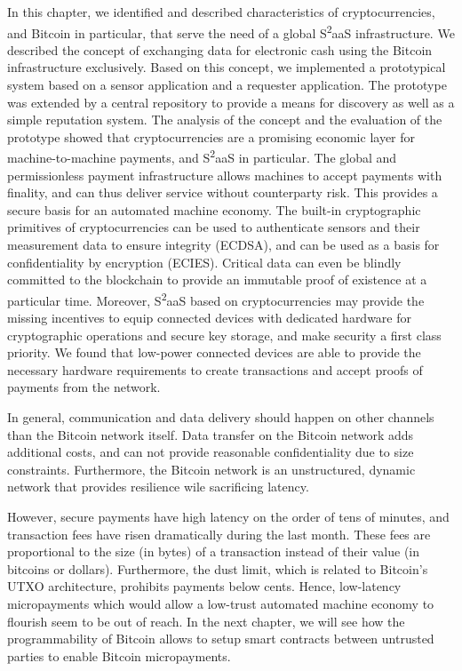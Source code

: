 In this chapter, we identified and described characteristics of cryptocurrencies, and Bitcoin in particular, that serve the need of a global S\textsuperscript{2}aaS infrastructure. We described the concept of exchanging data for electronic cash using the Bitcoin infrastructure exclusively. Based on this concept, we implemented a prototypical system based on a sensor application and a requester application. The prototype was extended by a central repository to provide a means for discovery as well as a simple reputation system. The analysis of the concept and the evaluation of the prototype showed that cryptocurrencies are a promising economic layer for machine-to-machine payments, and S\textsuperscript{2}aaS in particular. The global and permissionless payment infrastructure allows machines to accept payments with finality, and can thus deliver service without counterparty risk. This provides a secure basis for an automated machine economy. The built-in cryptographic primitives of cryptocurrencies can be used to authenticate sensors and their measurement data to ensure integrity (\ac{ECDSA}), and can be used as a basis for confidentiality by encryption (\ac{ECIES}). Critical data can even be blindly committed to the blockchain to provide an immutable proof of existence at a particular time. Moreover, S\textsuperscript{2}aaS based on cryptocurrencies may provide the missing incentives to equip connected devices with dedicated hardware for cryptographic operations and secure key storage, and make security a first class priority. 
We found that low-power connected devices are able to provide the necessary hardware requirements to create transactions and accept proofs of payments from the network. 

In general, communication and data delivery should happen on other channels than the Bitcoin network itself. Data transfer on the Bitcoin network adds additional costs, and can not provide reasonable confidentiality due to size constraints. Furthermore, the Bitcoin network is an unstructured, dynamic network that provides resilience wile sacrificing latency.

However, secure payments have high latency on the order of tens of minutes, and transaction fees have risen dramatically during the last month. These fees are proportional to the size (in bytes) of a transaction instead of their value (in bitcoins or dollars). Furthermore, the dust limit, which is related to Bitcoin's \ac{UTXO} architecture, prohibits payments below cents. Hence, low-latency micropayments which would allow a low-trust automated machine economy to flourish seem to be out of reach. In the next chapter, we will see how the programmability of Bitcoin allows to setup smart contracts between untrusted parties to enable Bitcoin micropayments. 








